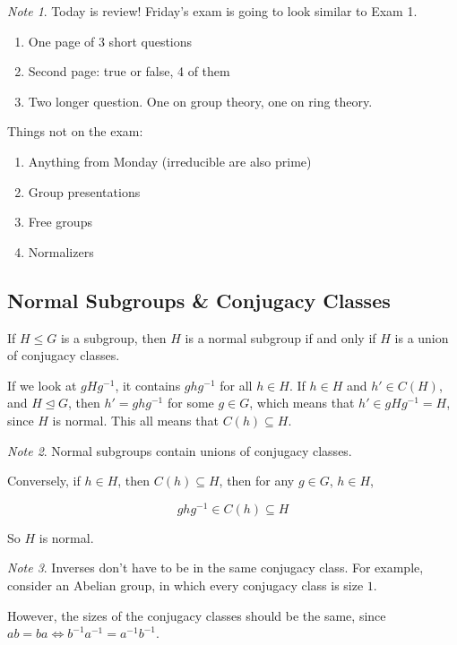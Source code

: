 \documentclass[12pt]{article}
\theoremstyle{remark}
\theoremstyle{remark}
\theoremstyle{remark}
\theoremstyle{remark}
\theoremstyle{remark}
\newtheorem*{note}{Note}
\begin{document}
\begin{note}
  Today is review! Friday's exam is going to look similar to Exam 1.

  \begin{enumerate}
    \item One page of 3 short questions
    \item Second page: true or false, 4 of them
    \item Two longer question. One on group theory, one on ring theory.
  \end{enumerate}

  Things not on the exam:
  \begin{enumerate}
    \item Anything from Monday (irreducible are also prime)
    \item Group presentations
    \item Free groups
    \item Normalizers
  \end{enumerate}
\end{note}

\subsection{Normal Subgroups \& Conjugacy Classes}

If $H \le G$ is a subgroup, then $H$ is a normal subgroup if and only if $H$ is
a union of conjugacy classes.

If we look at $gHg^{-1}$, it contains $ghg^{-1}$ for all $h \in H$. If $h \in H$
and $h' \in C(H)$, and $H \trianglelefteq G$, then $h' = ghg^{-1}$ for some $g
\in G$, which means that $h' \in gHg^{-1} = H$, since $H$ is normal. This all
means that $C(h) \subseteq H$.

\begin{note}
  Normal subgroups contain unions of conjugacy classes.
\end{note}

Conversely, if $h \in H$, then $C(h) \subseteq H$, then for any $g \in G$, $h \in
H$, 

\[
  ghg^{-1} \in C(h) \subseteq H
\]

So $H$ is normal.

\begin{note}
  Inverses don't have to be in the same conjugacy class. For example, consider
  an Abelian group, in which every conjugacy class is size $1$.

  However, the sizes of the conjugacy classes should be the same, since $ab = ba
  \Leftrightarrow b^{-1}a^{-1} = a^{-1}b^{-1}$.
\end{note}
\end{document}

